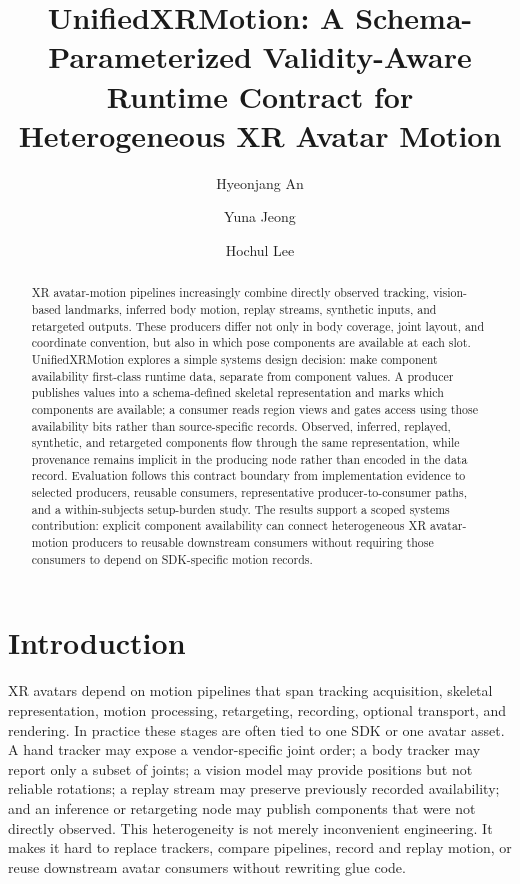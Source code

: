 \documentclass[runningheads]{llncs}
\begin{document}
\title{UnifiedXRMotion: A Schema-Parameterized Validity-Aware Runtime Contract for Heterogeneous XR Avatar Motion}
\author{Hyeonjang An \and 
Yuna Jeong \and 
Hochul Lee}
\maketitle

\begin{abstract}
	XR avatar-motion pipelines increasingly combine directly observed tracking, vision-based landmarks, inferred body motion, replay streams, synthetic inputs, and retargeted outputs. These producers differ not only in body coverage, joint layout, and coordinate convention, but also in which pose components are available at each slot. UnifiedXRMotion explores a simple systems design decision: make component availability first-class runtime data, separate from component values. A producer publishes values into a schema-defined skeletal representation and marks which components are available; a consumer reads region views and gates access using those availability bits rather than source-specific records. Observed, inferred, replayed, synthetic, and retargeted components flow through the same representation, while provenance remains implicit in the producing node rather than encoded in the data record. Evaluation follows this contract boundary from implementation evidence to selected producers, reusable consumers, representative producer-to-consumer paths, and a within-subjects setup-burden study. The results support a scoped systems contribution: explicit component availability can connect heterogeneous XR avatar-motion producers to reusable downstream consumers without requiring those consumers to depend on SDK-specific motion records.
\end{abstract}

\section{Introduction}\label{sec:introduction}
XR avatars depend on motion pipelines that span tracking acquisition, skeletal representation, motion processing, retargeting, recording, optional transport, and rendering. In practice these stages are often tied to one SDK or one avatar asset. A hand tracker may expose a vendor-specific joint order; a body tracker may report only a subset of joints; a vision model may provide positions but not reliable rotations; a replay stream may preserve previously recorded availability; and an inference or retargeting node may publish components that were not directly observed. This heterogeneity is not merely inconvenient engineering. It makes it hard to replace trackers, compare pipelines, record and replay motion, or reuse downstream avatar consumers without rewriting glue code.
\end{document}
